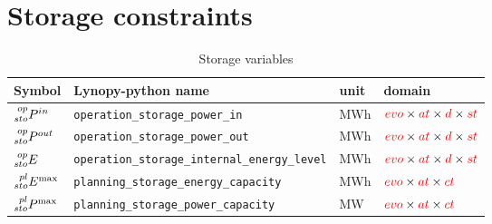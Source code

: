 \documentclass[a4paper,11pt]{article}
\begin{document}
\section{Storage constraints}
\footnotesize
\begin{table}[h]
\footnotesize
  \centering
    \caption{Storage variables}
  \begin{tabular}{llll}
    \hline
    \textbf{Symbol} & \textbf{Lynopy-python name} & \textbf{unit}  & \textbf{domain} \\ \hline
    
    $\prescript{op}{sto}{P^{in}}$ & \verb|operation_storage_power_in| & MWh & $\textcolor{red}{evo} \times \textcolor{red}{at} \times \textcolor{red}{d} \times \textcolor{red}{st}$ \\ 
    
    $\prescript{op}{sto}{P^{out}}$  & \verb|operation_storage_power_out|& MWh & $\textcolor{red}{evo} \times \textcolor{red}{at} \times \textcolor{red}{d} \times \textcolor{red}{st}$\\ 
    
    $\prescript{op}{sto}{E}$  & \verb|operation_storage_internal_energy_level|& MWh & $\textcolor{red}{evo} \times \textcolor{red}{at} \times \textcolor{red}{d} \times \textcolor{red}{st}$ \\ \hline
     
    $\prescript{pl}{sto}{E^{\max}}$ & \verb|planning_storage_energy_capacity|& MWh & $\textcolor{red}{evo} \times \textcolor{red}{at} \times \textcolor{red}{ct}$\\ 
    
    $\prescript{pl}{sto}{P^{\max}}$ & \verb|planning_storage_power_capacity|& MW & $\textcolor{red}{evo} \times \textcolor{red}{at} \times \textcolor{red}{ct}$ \\ \hline
  \end{tabular}
\end{table}
\end{document}
